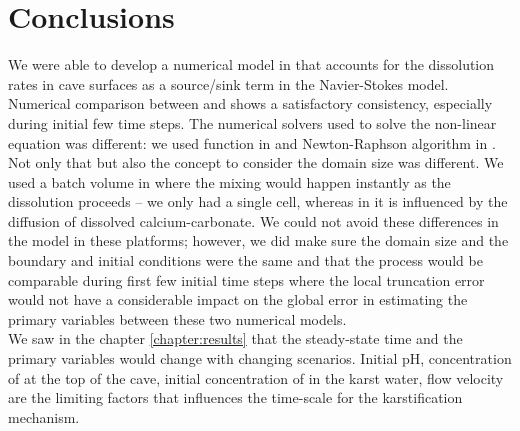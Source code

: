 \chapter{Conclusions} \label{chapter:conclusions}
\thispagestyle{empty}
We were able to develop a numerical model in \DuMuX that accounts for the dissolution rates in cave surfaces as a source/sink term in the Navier-Stokes model. \\


Numerical comparison between \DuMuX and \MATLAB shows a satisfactory consistency, especially during initial few time steps. The numerical solvers used to solve the non-linear equation was different: we used  function in \MATLAB and Newton-Raphson algorithm in \DuMuX. Not only that but also the concept to consider the domain size was different. We used a batch volume in \MATLAB where the mixing would happen instantly as the dissolution proceeds -- we only had a single cell, whereas in \DuMuX it is influenced by the diffusion of dissolved calcium-carbonate. We could not avoid these differences in the model in these platforms; however, we did make sure the domain size and the boundary and initial conditions were the same and that the process would be comparable during first few initial time steps where the local truncation error would not have a considerable impact on the global error in estimating the primary variables between these two numerical models.\\

We saw in the chapter \ref{chapter:results} that the steady-state time and the primary variables would change with changing scenarios. Initial pH, concentration of  at the top of the cave, initial concentration of  in the karst water, flow velocity are the limiting factors that influences the time-scale for the karstification mechanism.\\

